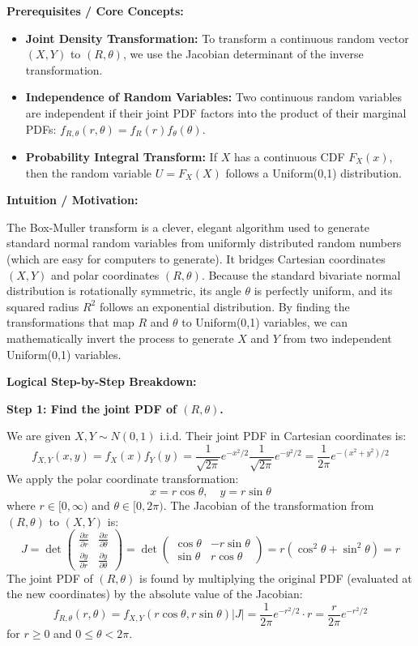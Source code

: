 \begin{solution}
\textbf{Prerequisites / Core Concepts:}
\begin{itemize}
    \item \textbf{Joint Density Transformation:} To transform a continuous random vector $(X, Y)$ to $(R, \theta)$, we use the Jacobian determinant of the inverse transformation.
    \item \textbf{Independence of Random Variables:} Two continuous random variables are independent if their joint PDF factors into the product of their marginal PDFs: $f_{R, \theta}(r, \theta) = f_R(r) f_\theta(\theta)$.
    \item \textbf{Probability Integral Transform:} If $X$ has a continuous CDF $F_X(x)$, then the random variable $U = F_X(X)$ follows a Uniform(0,1) distribution.
\end{itemize}

\textbf{Intuition / Motivation:}

The Box-Muller transform is a clever, elegant algorithm used to generate standard normal random variables from uniformly distributed random numbers (which are easy for computers to generate). It bridges Cartesian coordinates $(X, Y)$ and polar coordinates $(R, \theta)$. Because the standard bivariate normal distribution is rotationally symmetric, its angle $\theta$ is perfectly uniform, and its squared radius $R^2$ follows an exponential distribution. By finding the transformations that map $R$ and $\theta$ to Uniform(0,1) variables, we can mathematically invert the process to generate $X$ and $Y$ from two independent Uniform(0,1) variables.

\textbf{Logical Step-by-Step Breakdown:}

\textbf{Step 1: Find the joint PDF of $(R, \theta)$.}

We are given $X, Y \sim N(0,1)$ i.i.d. Their joint PDF in Cartesian coordinates is:
\[ f_{X,Y}(x, y) = f_X(x) f_Y(y) = \frac{1}{\sqrt{2\pi}} e^{-x^2/2} \frac{1}{\sqrt{2\pi}} e^{-y^2/2} = \frac{1}{2\pi} e^{-(x^2+y^2)/2} \]
We apply the polar coordinate transformation:
\[ x = r \cos \theta, \quad y = r \sin \theta \]
where $r \in [0, \infty)$ and $\theta \in [0, 2\pi)$.
The Jacobian of the transformation from $(R, \theta)$ to $(X, Y)$ is:
\[ J = \det \begin{pmatrix} \frac{\partial x}{\partial r} & \frac{\partial x}{\partial \theta} \\ \frac{\partial y}{\partial r} & \frac{\partial y}{\partial \theta} \end{pmatrix} = \det \begin{pmatrix} \cos \theta & -r \sin \theta \\ \sin \theta & r \cos \theta \end{pmatrix} = r(\cos^2\theta + \sin^2\theta) = r \]
The joint PDF of $(R, \theta)$ is found by multiplying the original PDF (evaluated at the new coordinates) by the absolute value of the Jacobian:
\[ f_{R,\theta}(r, \theta) = f_{X,Y}(r\cos\theta, r\sin\theta) |J| = \frac{1}{2\pi} e^{-r^2/2} \cdot r = \frac{r}{2\pi} e^{-r^2/2} \]
for $r \geq 0$ and $0 \leq \theta < 2\pi$.


\end{solution}
